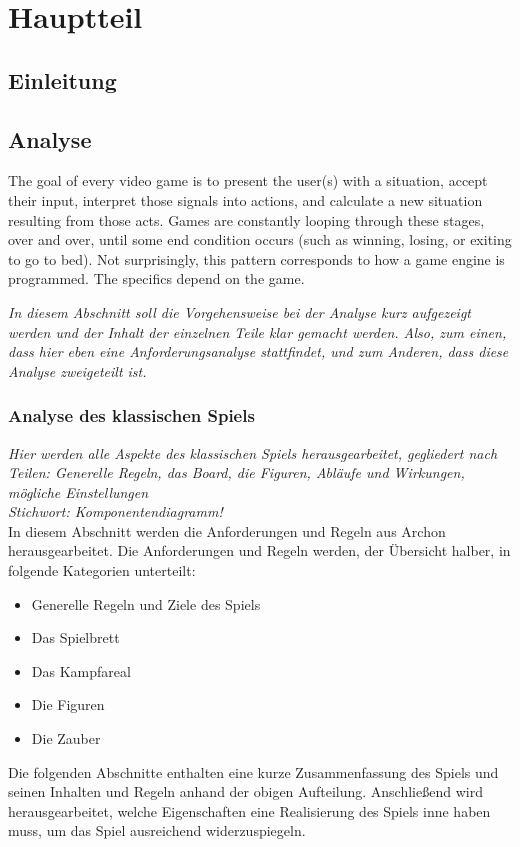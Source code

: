 \chapter{Hauptteil}
\label{cha:Hauptteil}

\section{Einleitung}

\section{Analyse}
\label{sec:analyse}

The goal of every video game is to present the user(s) with a situation, accept their input, interpret those signals into actions, and calculate a new situation resulting from those acts. Games are constantly looping through these stages, over and over, until some end condition occurs (such as winning, losing, or exiting to go to bed). Not surprisingly, this pattern corresponds to how a game engine is programmed. The specifics depend on the game. \cite{https://developer.mozilla.org/en-us/docs/games/anatomy}

\emph{In diesem Abschnitt soll die Vorgehensweise bei der Analyse kurz aufgezeigt werden und der Inhalt der einzelnen Teile klar gemacht werden. Also, zum einen, dass hier eben eine Anforderungsanalyse stattfindet, und zum Anderen, dass diese Analyse zweigeteilt ist.}

\subsection{Analyse des klassischen Spiels}
\label{subsec:spiel_analyse}

\emph{Hier werden alle Aspekte des klassischen Spiels herausgearbeitet, gegliedert nach Teilen: Generelle Regeln, das Board, die Figuren, Abläufe und Wirkungen, mögliche Einstellungen\\Stichwort: Komponentendiagramm!}
\\In diesem Abschnitt werden die Anforderungen und Regeln aus Archon herausgearbeitet. Die Anforderungen und Regeln werden, der Übersicht halber, in folgende Kategorien unterteilt: 
\begin{itemize}
	\item Generelle Regeln und Ziele des Spiels
	\item Das Spielbrett
	\item Das Kampfareal
	\item Die Figuren
	\item Die Zauber
\end{itemize}
Die folgenden Abschnitte enthalten eine kurze Zusammenfassung des Spiels und seinen Inhalten und Regeln anhand der obigen Aufteilung. Anschließend wird herausgearbeitet, welche Eigenschaften eine Realisierung des Spiels inne haben muss, um das Spiel ausreichend widerzuspiegeln. 
